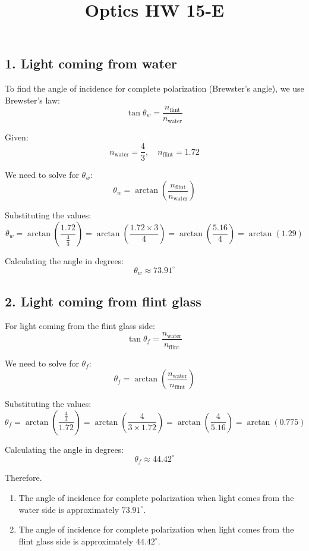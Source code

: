 \documentclass{article}
\begin{document}
\title{Optics HW 15-E}
\author{}
\date{}
\maketitle

\subsection*{1. Light coming from water}

To find the angle of incidence for complete polarization (Brewster's angle), we use Brewster's law:
\[
\tan \theta_w = \frac{n_{\text{flint}}}{n_{\text{water}}}
\]

Given:
\[
n_{\text{water}} = \frac{4}{3}, \quad n_{\text{flint}} = 1.72
\]

We need to solve for $\theta_w$:
\[
\theta_w = \arctan \left( \frac{n_{\text{flint}}}{n_{\text{water}}} \right)
\]

Substituting the values:
\[
\theta_w = \arctan \left( \frac{1.72}{\frac{4}{3}} \right) = \arctan \left( \frac{1.72 \times 3}{4} \right) = \arctan \left( \frac{5.16}{4} \right) = \arctan (1.29)
\]

Calculating the angle in degrees:
\[
\theta_w \approx 73.91^\circ
\]

\subsection*{2. Light coming from flint glass}

For light coming from the flint glass side:
\[
\tan \theta_f = \frac{n_{\text{water}}}{n_{\text{flint}}}
\]

We need to solve for $\theta_f$:
\[
\theta_f = \arctan \left( \frac{n_{\text{water}}}{n_{\text{flint}}} \right)
\]

Substituting the values:
\[
\theta_f = \arctan \left( \frac{\frac{4}{3}}{1.72} \right) = \arctan \left( \frac{4}{3 \times 1.72} \right) = \arctan \left( \frac{4}{5.16} \right) = \arctan (0.775)
\]

Calculating the angle in degrees:
\[
\theta_f \approx 44.42^\circ
\]

Therefore.
\begin{enumerate}
    \item The angle of incidence for complete polarization when light comes from the water side is approximately $73.91^\circ$.
    \item The angle of incidence for complete polarization when light comes from the flint glass side is approximately $44.42^\circ$.
\end{enumerate}
\end{document}

